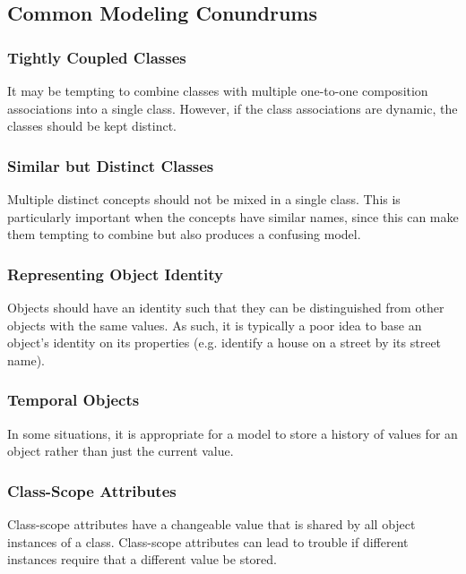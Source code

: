 \documentclass[12pt,titlepage]{article}
\begin{document}
    \subsection{Common Modeling Conundrums}

      \subsubsection{Tightly Coupled Classes}
        It may be tempting to combine classes with multiple one-to-one composition associations into a single class. However, if the class associations are dynamic, the classes should
        be kept distinct.

      \subsubsection{Similar but Distinct Classes}
        Multiple distinct concepts should not be mixed in a single class. This is particularly important when the concepts have similar names, since this can make them tempting to
        combine but also produces a confusing model.

      \subsubsection{Representing Object Identity}
        Objects should have an identity such that they can be distinguished from other objects with the same values. As such, it is typically a poor idea to base an object's identity
        on its properties (e.g. identify a house on a street by its street name).

      \subsubsection{Temporal Objects}
        In some situations, it is appropriate for a model to store a history of values for an object rather than just the current value.

      \subsubsection{Class-Scope Attributes}
        Class-scope attributes have a changeable value that is shared by all object instances of a class. Class-scope attributes can lead to trouble if different instances require
        that a different value be stored.

  \newpage
\end{document}
